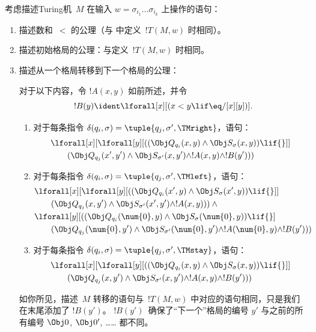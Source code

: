 \documentclass[../../../include/open-logic-section]{subfiles}
\begin{document}
考虑描述Turing机~$M$ 在输入 $w = \sigma_{i_1}\dots\sigma_{i_k}$ 上操作的语句：
\begin{enumerate}
\item 描述数和~$<$ 的公理（与  中定义~$!T(M,w)$ 时相同）。
\item 描述初始格局的公理：与定义~$!T(M,w)$ 时相同。
\item 描述从一个格局转移到下一个格局的公理：

对于以下内容，令 $!A(x, y)$ 如前所述，并令
\[
  !B(y) \ident \lforall[x][(x < y \lif \eq/[x][y])].
\]
\begin{enumerate}
\item {} 对于每条指令 $\delta(q_i, \sigma) =
  \tuple{q_j, \sigma', \TMright}$，语句：
\begin{align*}
& \lforall[x][\lforall[y][(
   (\Obj Q_{q_i}(x, y) \land \Obj S_{\sigma}(x, y)) \lif {}]] \\
&\qquad   (\Obj Q_{q_j}(x', y') \land \Obj S_{\sigma'}(x, y') \land
!A(x, y) \land !B(y')))
\end{align*}
\item {} 对于每条指令 $\delta(q_i, \sigma) =
  \tuple{q_j, \sigma', \TMleft}$，语句：
\begin{align*}
& \lforall[x][\lforall[y][
    ((\Obj Q_{q_i}(x', y) \land \Obj S_{\sigma}(x', y)) \lif {}]]\\
& \qquad   (\Obj Q_{q_j}(x, y') \land \Obj S_{\sigma'}(x', y') \land
!A(x, y))) \land {}\\
& \lforall[y][((\Obj Q_{q_i}(\num{0}, y) \land \Obj S_{\sigma}(\num{0},
    y)) \lif {}]\\
& \qquad (\Obj Q_{q_j}(\num{0}, y') \land \Obj S_{\sigma'}(\num{0},
  y') \land !A(\num{0}, y) \land !B(y')))
\end{align*}
\item {} 对于每条指令 $\delta(q_i, \sigma) =
  \tuple{q_j, \sigma', \TMstay}$，语句：
\begin{align*}
& \lforall[x][\lforall[y][(
   (\Obj Q_{q_i}(x, y) \land \Obj S_{\sigma}(x, y)) \lif {}]] \\
&\qquad (\Obj Q_{q_j}(x, y') \land \Obj S_{\sigma'}(x, y') \land
!A(x, y) \land !B(y')))
\end{align*}
\end{enumerate}
如你所见，描述~$M$ 转移的语句与~$!T(M,w)$ 中对应的语句相同，只是我们在末尾添加了 $!B(y')$。
$!B(y')$~确保了“下一个”格局的编号 $y'$ 与之前的所有编号 $\Obj 0$, $\Obj 0'$, …… 都不同。

\end{enumerate}
\end{document}
